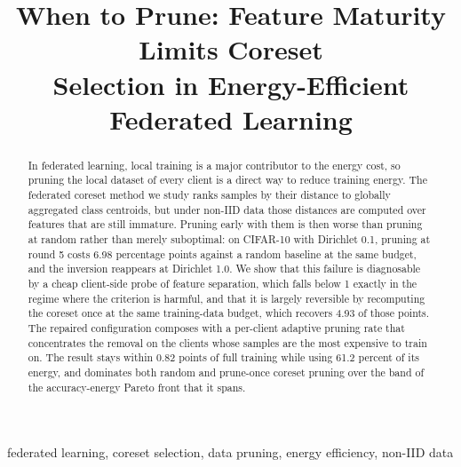 \documentclass[conference]{IEEEtran}
\begin{document}
\title{When to Prune: Feature Maturity Limits Coreset\\Selection in Energy-Efficient Federated Learning}

\author{}

\maketitle

\begin{abstract}
In federated learning, local training is a major contributor to the energy cost, so
pruning the local dataset of every client is a direct way to reduce training energy.
The federated coreset method we study ranks samples by their distance to globally
aggregated class centroids, but under non-IID data those distances are computed
over features that are still immature. Pruning early with them is then worse than
pruning at random rather than merely suboptimal: on CIFAR-10 with Dirichlet 0.1,
pruning at round 5 costs 6.98 percentage points against a random baseline at the
same budget, and the inversion reappears at Dirichlet 1.0. We show that this failure
is diagnosable by a cheap client-side probe of feature separation, which falls below
1 exactly in the regime where the criterion is harmful, and that it is largely
reversible by recomputing the coreset once at the same training-data budget, which
recovers 4.93 of those points. The repaired configuration composes with a per-client
adaptive pruning rate that concentrates the removal on the clients whose samples are
the most expensive to train on. The result stays within 0.82 points of full training
while using 61.2 percent of its energy, and dominates both random and prune-once
coreset pruning over the band of the accuracy-energy Pareto front that it spans.
\end{abstract}

\begin{IEEEkeywords}
federated learning, coreset selection, data pruning, energy efficiency, non-IID data
\end{IEEEkeywords}
\end{document}

